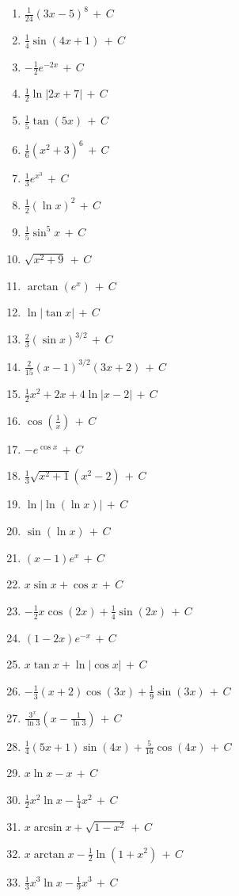 \documentclass[12pt, letterpaper]{article}
\newcommand{\CC}{\,+\,C}
\begin{document}
\begin{enumerate}[leftmargin=*, label=\textbf{\arabic*.}]
  \item $\frac{1}{24}(3x-5)^8 \CC$
  \item $\frac{1}{4}\sin(4x+1) \CC$
  \item $-\frac{1}{2}e^{-2x} \CC$
  \item $\frac{1}{2}\ln|2x+7| \CC$
  \item $\frac{1}{5}\tan(5x) \CC$
  \item $\frac{1}{6}(x^2+3)^6 \CC$
  \item $\frac{1}{3}e^{x^3} \CC$
  \item $\frac{1}{2}(\ln x)^2 \CC$
  \item $\frac{1}{5}\sin^5 x \CC$
  \item $\sqrt{x^2+9} \CC$
  \item $\arctan(e^x) \CC$
  \item $\ln|\tan x| \CC$
  \item $\frac{2}{3}(\sin x)^{3/2} \CC$
  \item $\frac{2}{15}(x-1)^{3/2}(3x+2) \CC$
  \item $\frac{1}{2}x^2 + 2x + 4\ln|x-2| \CC$
  \item $\cos\left(\frac{1}{x}\right) \CC$
  \item $-e^{\cos x} \CC$
  \item $\frac{1}{3}\sqrt{x^2+1}(x^2-2) \CC$
  \item $\ln|\ln(\ln x)| \CC$
  \item $\sin(\ln x) \CC$
  \item $(x-1)e^x \CC$
  \item $x\sin x + \cos x \CC$
  \item $-\frac{1}{2}x\cos(2x) + \frac{1}{4}\sin(2x) \CC$
  \item $(1-2x)e^{-x} \CC$
  \item $x\tan x + \ln|\cos x| \CC$
  \item $-\frac{1}{3}(x+2)\cos(3x) + \frac{1}{9}\sin(3x) \CC$
  \item $\frac{3^x}{\ln 3}\left(x - \frac{1}{\ln 3}\right) \CC$
  \item $\frac{1}{4}(5x+1)\sin(4x) + \frac{5}{16}\cos(4x) \CC$
  \item $x\ln x - x \CC$
  \item $\frac{1}{2}x^2\ln x - \frac{1}{4}x^2 \CC$
  \item $x\arcsin x + \sqrt{1-x^2} \CC$
  \item $x\arctan x - \frac{1}{2}\ln(1+x^2) \CC$
  \item $\frac{1}{3}x^3\ln x - \frac{1}{9}x^3 \CC$

\end{enumerate}
\end{document}
